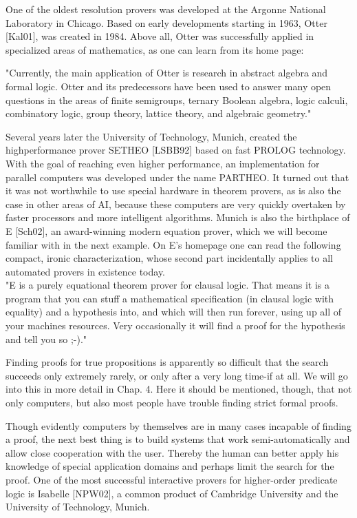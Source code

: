 \documentclass[10pt]{article}
\begin{document}
One of the oldest resolution provers was developed at the Argonne National Laboratory in Chicago. Based on early developments starting in 1963, Otter [Kal01], was created in 1984. Above all, Otter was successfully applied in specialized areas of mathematics, as one can learn from its home page:

\begin{displayquote}
"Currently, the main application of Otter is research in abstract algebra and formal logic. Otter and its predecessors have been used to answer many open questions in the areas of finite semigroups, ternary Boolean algebra, logic calculi, combinatory logic, group theory, lattice theory, and algebraic geometry."
\end{displayquote}

Several years later the University of Technology, Munich, created the highperformance prover SETHEO [LSBB92] based on fast PROLOG technology. With the goal of reaching even higher performance, an implementation for parallel computers was developed under the name PARTHEO. It turned out that it was not worthwhile to use special hardware in theorem provers, as is also the case in other areas of AI, because these computers are very quickly overtaken by faster processors and more intelligent algorithms. Munich is also the birthplace of E [Sch02], an award-winning modern equation prover, which we will become familiar with in the next example. On E's homepage one can read the following compact, ironic characterization, whose second part incidentally applies to all automated provers in existence today.\\
"E is a purely equational theorem prover for clausal logic. That means it is a program that you can stuff a mathematical specification (in clausal logic with equality) and a hypothesis into, and which will then run forever, using up all of your machines resources. Very occasionally it will find a proof for the hypothesis and tell you so ;-)."

Finding proofs for true propositions is apparently so difficult that the search succeeds only extremely rarely, or only after a very long time-if at all. We will go into this in more detail in Chap. 4. Here it should be mentioned, though, that not only computers, but also most people have trouble finding strict formal proofs.

Though evidently computers by themselves are in many cases incapable of finding a proof, the next best thing is to build systems that work semi-automatically and allow close cooperation with the user. Thereby the human can better apply his knowledge of special application domains and perhaps limit the search for the proof. One of the most successful interactive provers for higher-order predicate logic is Isabelle [NPW02], a common product of Cambridge University and the University of Technology, Munich.
\end{document}
